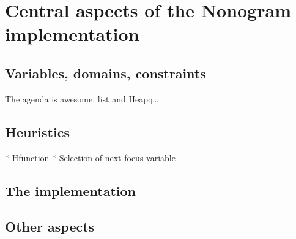 
\section{Central aspects of the Nonogram implementation}
\subsection{Variables, domains, constraints}
The agenda is awesome. list and Heapq\ldots

\subsection{Heuristics}
* H\-function
* Selection of next focus variable

\subsection*{The implementation}

\subsection{Other aspects}